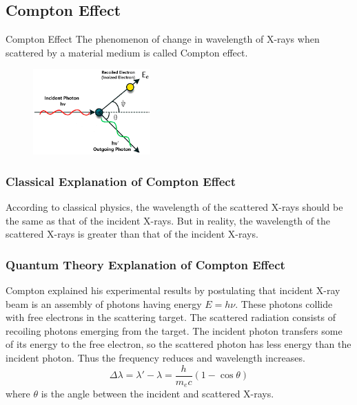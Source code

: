 \documentclass[12pt]{article}
\numberwithin{equation}{subsection}
\begin{document}
\subsection{Compton Effect}
\begin{definition}{Compton Effect}{}
    The phenomenon of change in wavelength of X-rays when scattered by a material medium is called Compton effect.
\end{definition}

\begin{figure}[htpb]
    \centering
    \includegraphics[width=0.4\textwidth]{compton.png}
\end{figure}

\subsubsection{Classical Explanation of Compton Effect}
According to classical physics, the wavelength of the scattered X-rays should be the same as that of the incident X-rays. But in reality, the wavelength of the scattered X-rays is greater than that of the incident X-rays.

\subsubsection{Quantum Theory Explanation of Compton Effect}
Compton explained his experimental results by postulating that incident X-ray beam is an assembly of photons having energy  $E=h\nu$. These photons collide with free electrons in the scattering target. The scattered radiation consists of recoiling photons emerging from the target. The incident photon transfers some of its energy to the free electron, so the scattered photon has less energy than the incident photon. Thus the frequency reduces and wavelength increases.
\begin{equation}
    \boxed{ \Delta \lambda = \lambda' - \lambda = \frac{h}{m_e c} (1 - \cos \theta) }
\end{equation}
where $\theta$ is the angle between the incident and scattered X-rays. \\~\\
\end{document}
